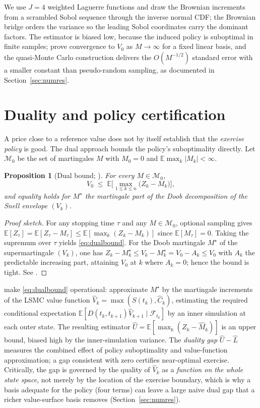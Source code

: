 \documentclass[11pt]{article}
\theoremstyle{plain}
\newtheorem{proposition}{Proposition}
\theoremstyle{definition}
\newcommand{\E}{\mathbb{E}}
\newcommand{\F}{\mathcal{F}}
\begin{document}
We use $J=4$ weighted Laguerre functions and draw the Brownian increments from a scrambled
Sobol sequence through the inverse normal CDF; the Brownian bridge orders the variance so the
leading Sobol coordinates carry the dominant factors. The estimator is biased low, because the
induced policy is suboptimal in finite samples; \cite{CLP2002} prove convergence to $V_0$ as
$M\to\infty$ for a fixed linear basis, and the quasi-Monte Carlo construction delivers the
$O(M^{-1/2})$ standard error with a smaller constant than pseudo-random sampling, as documented
in Section~\ref{sec:numres}.

\section{Duality and policy certification}
\label{sec:dual}

A price close to a reference value does not by itself establish that the \emph{exercise policy}
is good. The dual approach bounds the policy's suboptimality directly. Let $\mathcal{M}_0$ be
the set of martingales $M$ with $M_0=0$ and $\E\max_k|M_k|<\infty$.

\begin{proposition}[Dual bound; \cite{Rogers2002,HaughKogan2004}]
\label{prop:dual}
For every $M\in\mathcal{M}_0$,
\begin{equation}
\label{eq:dualbound}
V_0 \;\le\; \E\Big[\max_{1\le k\le n}\big(Z_k - M_k\big)\Big],
\end{equation}
and equality holds for $M^\star$ the martingale part of the Doob decomposition of the Snell
envelope $(V_k)$.
\end{proposition}

\begin{proof}[Proof sketch]
For any stopping time $\tau$ and any $M\in\mathcal{M}_0$, optional sampling gives
$\E[Z_\tau]=\E[Z_\tau-M_\tau]\le\E[\max_k(Z_k-M_k)]$ since $\E[M_\tau]=0$. Taking the supremum
over $\tau$ yields \eqref{eq:dualbound}. For the Doob martingale $M^\star$ of the supermartingale
$(V_k)$, one has $Z_k-M^\star_k\le V_k-M^\star_k = V_0-A_k\le V_0$ with $A_k$ the predictable
increasing part, attaining $V_0$ at $k$ where $A_k=0$; hence the bound is tight. See
\cite{Rogers2002}.
\end{proof}

\cite{AndersenBroadie2004} make \eqref{eq:dualbound} operational: approximate $M^\star$ by the
martingale increments of the LSMC value function $\hat V_k=\max(S(t_k),\hat C_k)$, estimating the
required conditional expectation $\E[D(t_k,t_{k+1})\hat V_{k+1}\mid\F_{t_k}]$ by an inner
simulation at each outer state. The resulting estimator $\hat U=\E[\max_k(Z_k-\hat M_k)]$ is an
upper bound, biased high by the inner-simulation variance. The \emph{duality gap}
$\hat U-\hat L$ measures the combined effect of policy suboptimality and value-function
approximation; a gap consistent with zero certifies near-optimal exercise. Critically, the gap
is governed by the quality of $\hat V_k$ as a \emph{function on the whole state space}, not
merely by the location of the exercise boundary, which is why a basis adequate for the policy
(four terms) can leave a large naive dual gap that a richer value-surface basis removes
(Section~\ref{sec:numres}).
\end{document}
